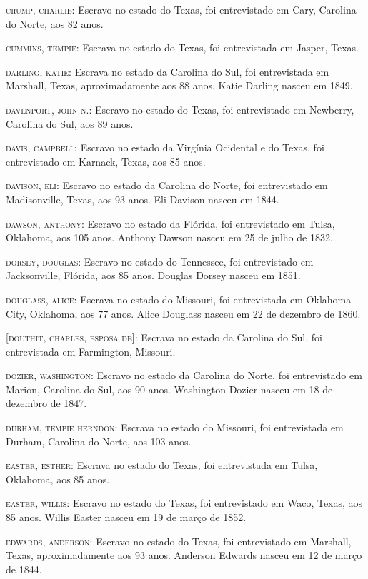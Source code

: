 \begin{Parskip}
\textsc{crump, charlie:} Escravo no estado do Texas, foi entrevistado em
Cary, Carolina do Norte, aos 82 anos.

\textsc{cummins, tempie:} Escrava no estado do Texas, foi entrevistada
em Jasper, Texas.

\textsc{darling, katie:} Escrava no estado da Carolina do Sul, foi
entrevistada em Marshall, Texas, aproximadamente aos 88 anos. Katie
Darling nasceu em 1849.

\textsc{davenport, john n.:} Escravo no estado do Texas, foi
entrevistado em Newberry, Carolina do Sul, aos 89 anos.

\textsc{davis, campbell:} Escravo no estado da Virgínia Ocidental e do
Texas, foi entrevistado em Karnack, Texas, aos 85 anos.

\textsc{davison, eli:} Escravo no estado da Carolina do Norte, foi
entrevistado em Madisonville, Texas, aos 93 anos. Eli Davison nasceu em
1844.

\textsc{dawson, anthony:} Escravo no estado da Flórida, foi entrevistado
em Tulsa, Oklahoma, aos 105 anos. Anthony Dawson nasceu em 25 de julho
de 1832.

\textsc{dorsey, douglas:} Escravo no estado do Tennessee, foi
entrevistado em Jacksonville, Flórida, aos 85 anos. Douglas Dorsey
nasceu em 1851.

\textsc{douglass, alice:} Escrava no estado do Missouri, foi
entrevistada em Oklahoma City, Oklahoma, aos 77 anos. Alice Douglass
nasceu em 22 de dezembro de 1860.

\textsc{{[}douthit, charles, esposa de{]}:} Escrava no estado da
Carolina do Sul, foi entrevistada em Farmington, Missouri.

\textsc{dozier, washington:} Escravo no estado da Carolina do Norte, foi
entrevistado em Marion, Carolina do Sul, aos 90 anos. Washington Dozier
nasceu em 18 de dezembro de 1847.

\textsc{durham, tempie herndon:} Escrava no estado do Missouri, foi
entrevistada em Durham, Carolina do Norte, aos 103 anos.

\textsc{easter, esther:} Escrava no estado do Texas, foi entrevistada em
Tulsa, Oklahoma, aos 85 anos.

\textsc{easter, willis:} Escravo no estado do Texas, foi entrevistado em
Waco, Texas, aos 85 anos. Willis Easter nasceu em 19 de março de 1852.

\textsc{edwards, anderson:} Escravo no estado do Texas, foi entrevistado
em Marshall, Texas, aproximadamente aos 93 anos. Anderson Edwards nasceu
em 12 de março de 1844.


\end{Parskip}

